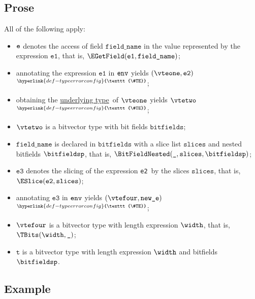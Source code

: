 \documentclass{book}
\newcommand\TypeErrorConfig[0]{\hyperlink{def-typeerrorconfig}{\texttt{\#TE}}}
\newcommand\ProseOrTypeError[0]{\hyperlink{def-proseortypeerror}{$^{\TypeErrorConfig}$}}
\newcommand\underlyingtype[0]{\hyperlink{def-underlyingtype}{underlying type}}
\newcommand\vt[0]{\texttt{t}}
\newcommand\veone[0]{\texttt{e1}}
\newcommand\vetwo[0]{\texttt{e2}}
\newcommand\vethree[0]{\texttt{e3}}
\newcommand\bitfields[0]{\texttt{bitfields}}
\newcommand\fieldname[0]{\texttt{field\_name}}
\newcommand\slices[0]{\texttt{slices}}
\newcommand\newe[0]{\texttt{new\_e}}
\begin{document}
\subsection{Prose}
All of the following apply:
\begin{itemize}
  \item $\texttt{e}$ denotes the access of field $\fieldname$ in the value represented by the expression $\veone$, that is, $\EGetField(\veone, \fieldname)$;
  \item annotating the expression $\veone$ in $\texttt{env}$ yields $(\vteone, \vetwo)$ \ProseOrTypeError;
  \item obtaining the \underlyingtype\ of $\vteone$ yields $\vtetwo$ \ProseOrTypeError;
  \item $\vtetwo$ is a bitvector type with bit fields $\bitfields$;
  \item $\fieldname$ is declared in $\bitfields$ with a slice list $\slices$ and nested bitfields $\bitfieldsp$, that is,
        $\BitFieldNested(\Ignore, \slices, \bitfieldsp)$;
  \item $\vethree$ denotes the slicing of the expression \vetwo\ by the slices $\slices$, that is, \\ $\ESlice(\vetwo, \slices)$;
  \item annotating $\vethree$ in $\texttt{env}$ yields $(\vtefour, \newe)$ \ProseOrTypeError;
  \item $\vtefour$ is a bitvector type with length expression $\width$, that is, $\TBits(\width, \Ignore)$;
  \item $\vt$ is a bitvector type with length expression $\width$ and bitfields $\bitfieldsp$.
\end{itemize}

\subsection{Example}

\end{document}
